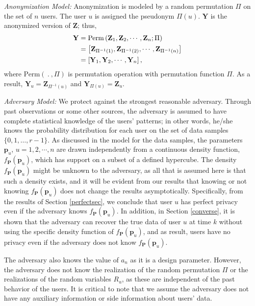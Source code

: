 \textit{Anonymization Model:} Anonymization is modeled by a random permutation $\Pi$ on the set of $n$ users. The user $u$ is assigned the pseudonym $\Pi(u)$. $\textbf{Y}$ is the anonymized version of $\textbf{Z}$; thus,
\begin{align}
\nonumber \textbf{Y} &=\textrm{Perm}\left(\textbf{Z}_{1}, \textbf{Z}_{2}, \cdots,  \textbf{Z}_{n}; \Pi \right) \\
\nonumber &=\left[ \textbf{Z}_{\Pi^{-1}(1)}, \textbf{Z}_{\Pi^{-1}(2)}, \cdots,  \textbf{Z}_{\Pi^{-1}(n)}\right ] \\
\nonumber &=\left[ \textbf{Y}_{1}, \textbf{Y}_{2}, \cdots, \textbf{Y}_{n}\right], \ \
\end{align}
where $\textrm{Perm}( \ . \ , \Pi)$ is permutation operation with permutation function $\Pi$. As a result, $\textbf{Y}_{u} = \textbf{Z}_{\Pi^{-1}(u)}$ and $\textbf{Y}_{\Pi(u)} = \textbf{Z}_{u}$.

\textit{Adversary Model:} We protect against the strongest reasonable adversary. Through past observations or some other sources, the adversary is assumed to have complete statistical knowledge of the users' patterns; in other words, he/she knows the probability distribution for each user on the set of data samples $\{0,1,\ldots,r-1\}$. As discussed in the model for the data samples, the parameters $\textbf{p}_u$, $u=1, 2, \cdots, n$ are drawn independently from a continuous density function, $f_\textbf{P}(\textbf{p}_u)$, which has support on a subset of a defined hypercube. The density $f_\textbf{P}(\textbf{p}_u)$ might be unknown to the adversary, as all that is assumed here is that such a density exists, and it will be evident from our results that knowing or not knowing $f_\textbf{P}(\textbf{p}_u)$ does not change the results asymptotically. Specifically, from the results of Section \ref{perfectsec}, we conclude that user $u$ has perfect privacy even if the adversary knows $f_\textbf{P}(\textbf{p}_u)$. In addition, in Section \ref{converse}, it is shown that the adversary can recover the true data of user $u$ at time $k$ without using the specific density function of $f_\textbf{P}(\textbf{p}_u)$, and as result, users have no privacy even if the adversary does not know $f_\textbf{P}(\textbf{p}_u)$.

The adversary also knows the value of $a_n$ as it is a design parameter. However, the adversary does not know the realization of the random permutation $\Pi$ or the realizations of the random variables $R_u$, as these are independent of the past behavior of the users. It is critical to note that we assume the adversary does not have any auxiliary information or side information about users' data.


